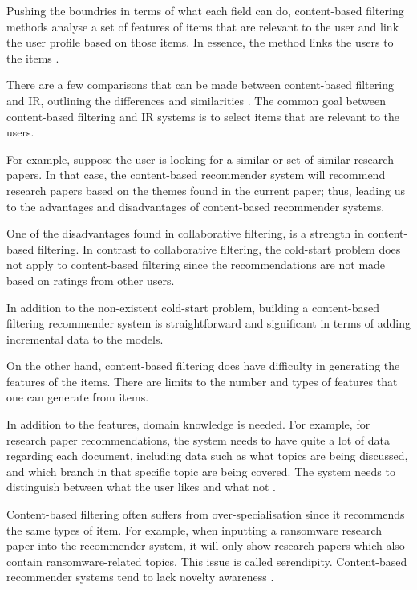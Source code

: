 Pushing the boundries in terms of what each field can do, content-based filtering methods analyse a set of features of items that are relevant to the user and link the user profile based on those items. In essence, the method links the users to the items \cite{lops2011content}.

There are a few comparisons that can be made between content-based filtering and IR, outlining the differences and similarities \cite{belkin1992information}. The common goal between content-based filtering and IR systems is to select items that are relevant to the users.

For example, suppose the user is looking for a similar or set of similar research papers. In that case, the content-based recommender system will recommend research papers based on the themes found in the current paper; thus, leading us to the advantages and disadvantages of content-based recommender systems.

One of the disadvantages found in collaborative filtering, is a strength in content-based filtering. In contrast to collaborative filtering, the cold-start problem does not apply to content-based filtering since the recommendations are not made based on ratings from other users.

In addition to the non-existent cold-start problem, building a content-based filtering recommender system is straightforward and significant in terms of  adding incremental data to the models.

On the other hand, content-based filtering does have difficulty in generating the features of the items. There are limits to the number and types of features that one can generate from items.

In addition to the features, domain knowledge is needed. For example, for research paper recommendations, the system needs to have quite a lot of data regarding each document, including data such as what topics are being discussed, and which branch in that specific topic are being covered. The system needs to distinguish between what the user likes and what not \cite{lops2011content}.

Content-based filtering often suffers from over-specialisation since it recommends the same types of item. For example, when inputting a ransomware research paper into the recommender system, it will only show research papers which also contain ransomware-related topics. This issue is called serendipity. Content-based recommender systems tend to lack novelty awareness \cite{shah2018}.

